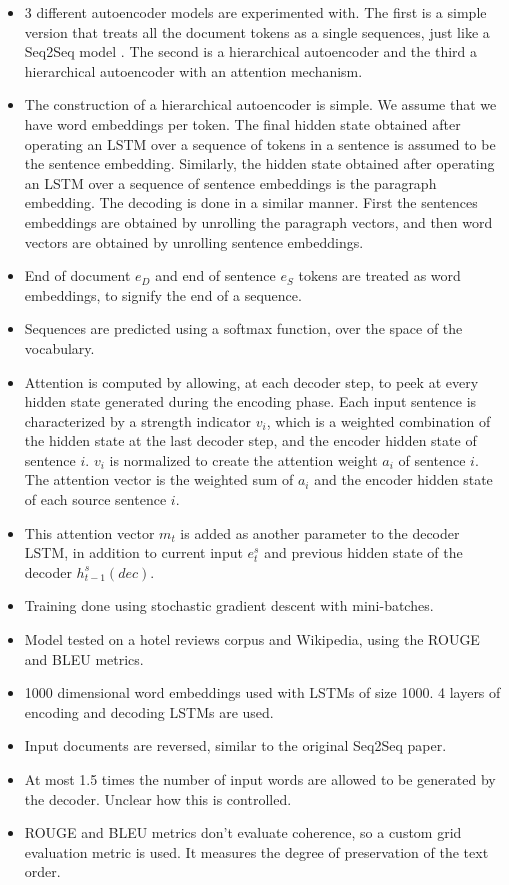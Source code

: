 \documentclass[12pt]{article}
\begin{document}
  \begin{itemize}
    \item 3 different autoencoder models are experimented with. The first is a simple version that treats all the document tokens as a single sequences, just like a Seq2Seq model \cite{sutskever2014sequence}. The second is a hierarchical autoencoder and the third a hierarchical autoencoder with an attention mechanism.
    \item The construction of a hierarchical autoencoder is simple. We assume that we have word embeddings per token. The final hidden state obtained after operating an LSTM over a sequence of tokens in a sentence is assumed to be the sentence embedding. Similarly, the hidden state obtained after operating an LSTM over a sequence of sentence embeddings is the paragraph embedding. The decoding is done in a similar manner. First the sentences embeddings are obtained by unrolling the paragraph vectors, and then word vectors are obtained by unrolling sentence embeddings.
    \item End of document $e_D$ and end of sentence $e_S$ tokens are treated as word embeddings, to signify the end of a sequence.
    \item Sequences are predicted using a softmax function, over the space of the vocabulary.
    \item Attention is computed by allowing, at each decoder step, to peek at every hidden state generated during the encoding phase. Each input sentence is characterized by a strength indicator $v_i$, which is a weighted combination of the hidden state at the last decoder step, and the encoder hidden state of sentence $i$. $v_i$ is normalized to create the attention weight $a_i$ of sentence $i$. The attention vector is the weighted sum of $a_i$ and the encoder hidden state of each source sentence $i$.
    \item This attention vector $m_t$ is added as another parameter to the decoder LSTM, in addition to current input $e^s_t$ and previous hidden state of the decoder $h^s_{t-1} (dec)$.
    \item Training done using stochastic gradient descent with mini-batches.
    \item Model tested on a hotel reviews corpus and Wikipedia, using the ROUGE and BLEU metrics.
    \item 1000 dimensional word embeddings used with LSTMs of size 1000. 4 layers of encoding and decoding LSTMs are used. 
    \item Input documents are reversed, similar to the original Seq2Seq paper.
    \item At most 1.5 times the number of input words are allowed to be generated by the decoder. Unclear how this is controlled.
    \item ROUGE and BLEU metrics don't evaluate coherence, so a custom grid evaluation metric is used. It measures the degree of preservation of the text order.
  \end{itemize}
\end{document}
